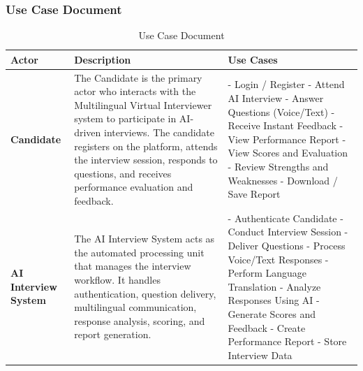 \documentclass[12pt]{article}
\numberwithin{figure}{subsection}
\begin{document}
\vspace{1cm}
\subsubsection{Use Case Document}
\vspace{10pt}

\begin{table}[H]
\centering
\renewcommand{\thetable}{5.1.1}

\small

\renewcommand{\arraystretch}{1.2}
\setlength{\tabcolsep}{4pt}

\begin{tabular}{|p{2.5cm}|p{5.2cm}|p{5.2cm}|}
\hline
\textbf{Actor} & \textbf{Description} & \textbf{Use Cases} \\
\hline

\textbf{Candidate} &
The Candidate is the primary actor who interacts with the Multilingual Virtual Interviewer system to participate in AI-driven interviews. The candidate registers on the platform, attends the interview session, responds to questions, and receives performance evaluation and feedback. &
- Login / Register \newline
- Attend AI Interview \newline
- Answer Questions (Voice/Text) \newline
- Receive Instant Feedback \newline
- View Performance Report \newline
- View Scores and Evaluation \newline
- Review Strengths and Weaknesses \newline
- Download / Save Report \\
\hline

\textbf{AI Interview System} &
The AI Interview System acts as the automated processing unit that manages the interview workflow. It handles authentication, question delivery, multilingual communication, response analysis, scoring, and report generation. &
- Authenticate Candidate \newline
- Conduct Interview Session \newline
- Deliver Questions \newline
- Process Voice/Text Responses \newline
- Perform Language Translation \newline
- Analyze Responses Using AI \newline
- Generate Scores and Feedback \newline
- Create Performance Report \newline
- Store Interview Data \\
\hline

\end{tabular}

\normalsize

\caption{Use Case Document}
\end{table}
\end{document}
